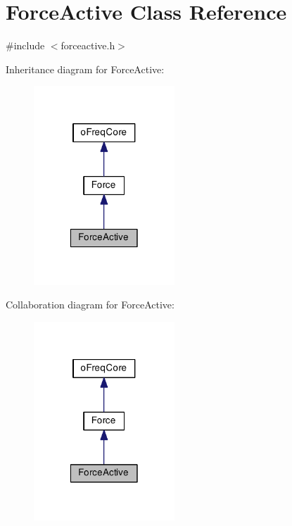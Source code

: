 \hypertarget{class_force_active}{\section{Force\-Active Class Reference}
\label{class_force_active}
}


{\ttfamily \#include $<$forceactive.\-h$>$}



Inheritance diagram for Force\-Active\-:\nopagebreak
\begin{figure}[H]
\begin{center}
\leavevmode
\includegraphics[width=150pt]{class_force_active__inherit__graph}
\end{center}
\end{figure}


Collaboration diagram for Force\-Active\-:\nopagebreak
\begin{figure}[H]
\begin{center}
\leavevmode
\includegraphics[width=150pt]{class_force_active__coll__graph}
\end{center}
\end{figure}
